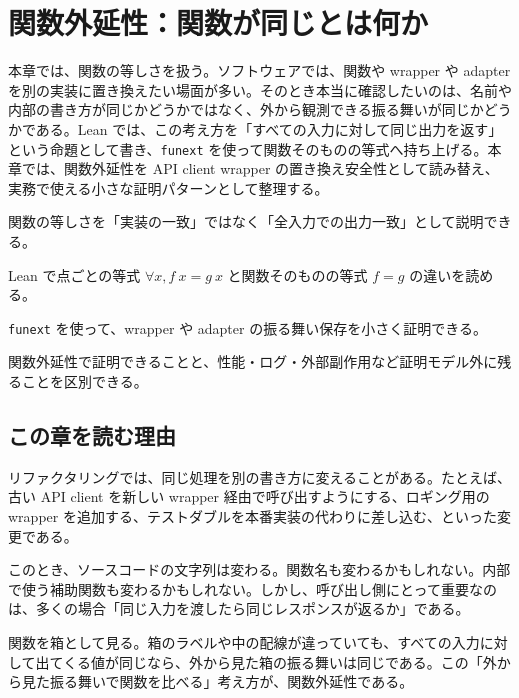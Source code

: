\chapter{関数外延性：関数が同じとは何か}
\label{chap:function-extensionality}

\begin{chapterabstract}
本章では、関数の等しさを扱う。ソフトウェアでは、関数や wrapper や adapter を別の実装に置き換えたい場面が多い。そのとき本当に確認したいのは、名前や内部の書き方が同じかどうかではなく、外から観測できる振る舞いが同じかどうかである。Lean では、この考え方を「すべての入力に対して同じ出力を返す」という命題として書き、\texttt{funext} を使って関数そのものの等式へ持ち上げる。本章では、関数外延性を API client wrapper の置き換え安全性として読み替え、実務で使える小さな証明パターンとして整理する。
\end{chapterabstract}

\begin{learninggoals}
\item 関数の等しさを「実装の一致」ではなく「全入力での出力一致」として説明できる。
\item Lean で点ごとの等式 \(\forall x, f\ x = g\ x\) と関数そのものの等式 \(f = g\) の違いを読める。
\item \texttt{funext} を使って、wrapper や adapter の振る舞い保存を小さく証明できる。
\item 関数外延性で証明できることと、性能・ログ・外部副作用など証明モデル外に残ることを区別できる。
\end{learninggoals}

\section{この章を読む理由}

リファクタリングでは、同じ処理を別の書き方に変えることがある。たとえば、古い API client を新しい wrapper 経由で呼び出すようにする、ロギング用の wrapper を追加する、テストダブルを本番実装の代わりに差し込む、といった変更である。

このとき、ソースコードの文字列は変わる。関数名も変わるかもしれない。内部で使う補助関数も変わるかもしれない。しかし、呼び出し側にとって重要なのは、多くの場合「同じ入力を渡したら同じレスポンスが返るか」である。

\begin{intuitionbox}
関数を箱として見る。箱のラベルや中の配線が違っていても、すべての入力に対して出てくる値が同じなら、外から見た箱の振る舞いは同じである。この「外から見た振る舞いで関数を比べる」考え方が、関数外延性である。
\end{intuitionbox}

